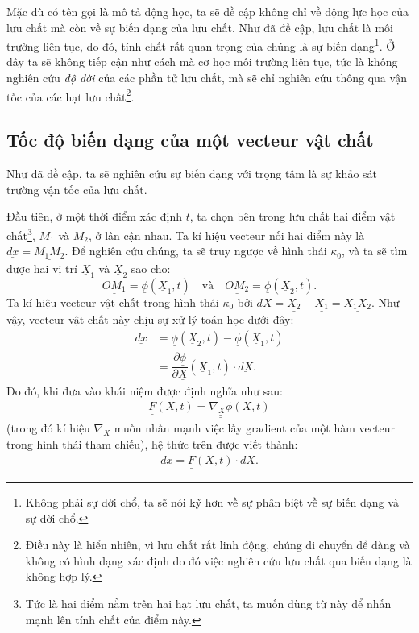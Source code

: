 \documentclass[../../../main.tex]{subfiles}
\begin{document}
    Mặc dù có tên gọi là mô tả động học, ta sẽ đề cập không chỉ về động lực học của lưu chất mà còn về sự biến dạng của lưu chất. Như đã đề cập, lưu chất là môi trường liên tục, do đó, tính chất rất quan trọng của chúng là sự biến dạng\footnote{Không phải sự dời chổ, ta sẽ nói kỹ hơn về sự phân biệt về sự biến dạng và sự dời chổ.}. Ở đây ta sẽ không tiếp cận như cách mà cơ học môi trường liên tục, tức là không nghiên cứu \emph{độ dời} của các phần tử lưu chất, mà sẽ chỉ nghiên cứu thông qua vận tốc của các hạt lưu chất\footnote{Điều này là hiển nhiên, vì lưu chất rất linh động, chúng di chuyển dể dàng và không có hình dạng xác định do đó việc nghiên cứu lưu chất qua biến dạng là không hợp lý.}.
\subsection{Tốc độ biến dạng của một vecteur vật chất}
    Như đã đề cập, ta sẽ nghiên cứu sự biến dạng với trọng tâm là sự khảo sát trường vận tốc của lưu chất.

    Đầu tiên, ở một thời điểm xác định $t$, ta chọn bên trong lưu chất hai điểm vật chất\footnote{Tức là hai điểm nằm trên hai hạt lưu chất, ta muốn dùng từ này để nhấn mạnh lên tính chất của điểm này.}, $M_1$ và $M_2$, ở lân cận nhau. Ta kí hiệu vecteur nối hai điểm này là $\underline{dx}=\underline{M_1M_2}$. Để nghiên cứu chúng, ta sẽ truy ngược về hình thái $\kappa_0$, và ta sẽ tìm được hai vị trí $\underline{X}_1$ và $\underline{X}_2$ sao cho:
		\[
			\underline{OM_1}=\underline{\phi}\left(\underline{X}_1,t\right)\quad\text{và}\quad\underline{OM_2}=\underline{\phi}\left(\underline{X}_2,t\right).
		\]
	Ta kí hiệu vecteur vật chất trong hình thái $\kappa_0$ bởi $\underline{dX}=\underline{X_2}-\underline{X_1}=\underline{X_1X_2}$. Như vậy, vecteur vật chất này chịu sự xử lý toán học dưới đây:
		\[
			\begin{aligned}
				\underline{dx}&=\underline{\phi}\left(\underline{X}_2,t\right)-\underline{\phi}\left(\underline{X}_1,t\right)\\
				&=\dfrac{\partial\underline{\phi}}{\partial\underline{X}}\left(\underline{X}_1,t\right)\cdot\underline{dX}.
			\end{aligned}
		\]
	Do đó, khi đưa vào khái niệm  được định nghĩa như sau:
		\begin{align}
			\boxed{\underline{\underline{F}}\left(\underline{X},t\right)=\underline{\underline{\nabla_X\phi}}\left(\underline{X},t\right)}
		\end{align}
	(trong đó kí hiệu $\nabla_X$ muốn nhấn mạnh việc lấy gradient của một hàm vecteur trong hình thái tham chiếu), hệ thức trên được viết thành:
		\begin{align}
			\underline{dx}=\underline{\underline{F}}\left(\underline{X},t\right)\cdot\underline{dX}.
		\end{align}
\end{document}
